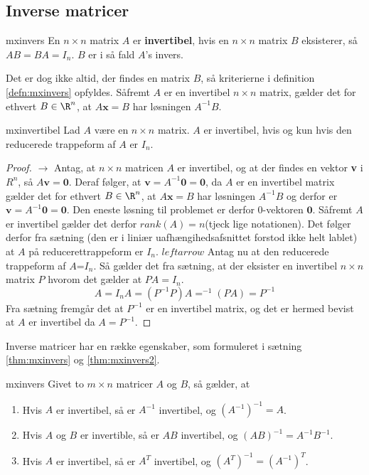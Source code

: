 \subsection{Inverse matricer}

\begin{defn}{}{mxinvers}
En $n \times n$ matrix $A$ er \textbf{invertibel}, hvis en $n \times n$ matrix $B$ eksisterer, så $AB=BA=I_n$. $B$ er i så fald $A$'s invers. 
\end{defn}
Det er dog ikke altid, der findes en matrix $B$, så kriterierne i definition \ref{defn:mxinvers} opfyldes. 
Såfremt $A$ er en invertibel $n \times n$ matrix, gælder det for ethvert $B \in \R^n$, at $A\textbf{x}=B$ har løsningen $A^{-1}B$.
%
\begin{thm}{}{mxinvertibel}
Lad $A$ være en $n \times n$ matrix. 
$A$ er invertibel, hvis og kun hvis den reducerede trappeform af $A$ er $I_n$.
\end{thm}
%
\begin{proof}
$\rightarrow$ Antag, at $n\times n$ matricen $A$ er invertibel, og at der findes en vektor \textbf{v} i $R^n$, så $A\textbf{v}=\textbf{0}$. 
Deraf følger, at $\textbf{v}=A^{-1}\textbf{0}=\textbf{0}$, da $A$ er en invertibel matrix gælder det for ethvert $B \in \R^n$, at $A\textbf{x}=B$ har løsningen $A^{-1}B$ og derfor er $\textbf{v}=A^{-1}\textbf{0}=\textbf{0}$. 
Den eneste løsning til problemet er derfor $0$-vektoren $\textbf{0}$. 
Såfremt $A$ er invertibel gælder det derfor $rank(A)=n$(tjeck lige notationen).
Det følger derfor fra sætning (den er i liniær uafhængihedsafsnittet forstod ikke helt lablet) at $A$ på reducerettrappeform er $I_n$.
$leftarrow$
Antag nu at den reducerede trappeform af $A$=$I_n$. 
Så gælder det fra sætning, at der eksister en invertibel $n \times n$ matrix $P$ hvorom det gælder at $PA=I_n$.
$$A=I_nA=(P^{-1}P)A=^{-1}(PA)=P^{-1}$$
Fra sætning fremgår det at $P^{-1}$ er en invertibel matrix, og det er hermed bevist at $A$ er invertibel da $A=P^{-1}$.

\end{proof}
Inverse matricer har en række egenskaber, som formuleret i sætning \ref{thm:mxinvers} og \ref{thm:mxinvers2}. 
%
\begin{thm}{}{mxinvers}
Givet to $m \times n$ matricer $A$ og $B$, så gælder, at
\begin{enumerate}[label=(\alph*)]
\item Hvis $A$ er invertibel, så er $A^{-1}$ invertibel, og $(A^{-1})^{-1}=A$.
\item Hvis $A$ og $B$ er invertible, så er $AB$ invertibel, og $(AB)^{-1}=A^{-1}B^{-1}$.
\item Hvis $A$ er invertibel, så er $A^T$ invertibel, og $(A^T)^{-1}=(A^{-1})^T$.
\end{enumerate}
\end{thm}
